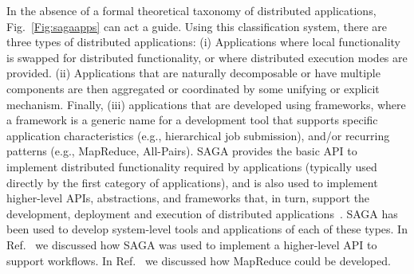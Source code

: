 \documentclass{rspublic}
\begin{document}


In the absence of a formal theoretical taxonomy of distributed
applications, Fig.~\ref{Fig:sagaapps} can act a guide.  Using this
classification system, there are three types of distributed
applications: (i) Applications where local functionality is swapped
for distributed functionality, or where distributed execution modes
are provided.  %
(ii) Applications that are naturally decomposable or have multiple
components are then aggregated or coordinated by some unifying or
explicit mechanism. %
Finally, (iii) applications that are developed using frameworks, where
a framework is a generic name for a development tool that supports
specific application characteristics (e.g., hierarchical job
submission), and/or recurring patterns (e.g., MapReduce, All-Pairs).
SAGA provides the basic API to implement distributed functionality
required by applications (typically used directly by the first
category of applications), and is also used to implement higher-level
APIs, abstractions, and frameworks that, in turn, support the
development, deployment and execution of distributed
applications~\cite{saga_gmac09}. SAGA has been used to develop
system-level tools and applications of each of these types. In
Ref.~\cite{saga_montage_escience09} we discussed how SAGA was used to
implement a higher-level API to support workflows. In
Ref.~\cite{saga_ccgrid09} we discussed how MapReduce could be
developed.
\end{document}
